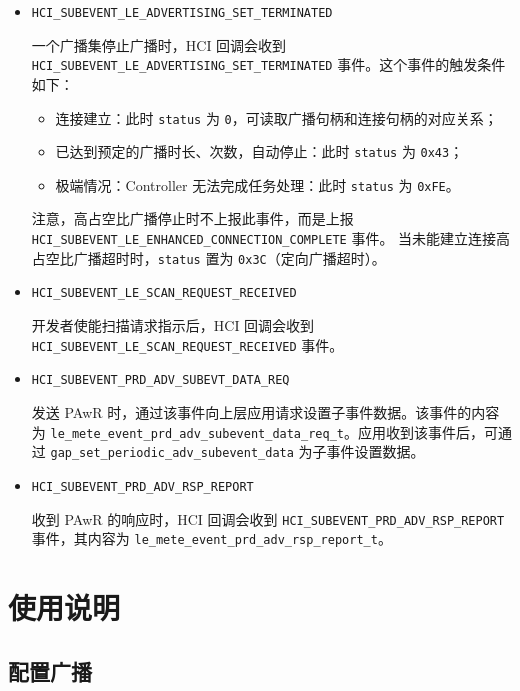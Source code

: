 \documentclass[
  12pt,
]{book}
\providecommand{\tightlist}{%
  \setlength{\itemsep}{0pt}\setlength{\parskip}{0pt}}
\begin{document}
\begin{itemize}
\item
  \texttt{HCI\_SUBEVENT\_LE\_ADVERTISING\_SET\_TERMINATED}

  一个广播集停止广播时，HCI 回调会收到 \texttt{HCI\_SUBEVENT\_LE\_ADVERTISING\_SET\_TERMINATED} 事件。这个事件的触发条件如下：

  \begin{itemize}
  \tightlist
  \item
    连接建立：此时 \texttt{status} 为 \texttt{0}，可读取广播句柄和连接句柄的对应关系；
  \item
    已达到预定的广播时长、次数，自动停止：此时 \texttt{status} 为 \texttt{0x43}；
  \item
    极端情况：Controller 无法完成任务处理：此时 \texttt{status} 为 \texttt{0xFE}。
  \end{itemize}

  注意，高占空比广播停止时不上报此事件，而是上报 \texttt{HCI\_SUBEVENT\_LE\_ENHANCED\_CONNECTION\_COMPLETE} 事件。
  当未能建立连接高占空比广播超时时，\texttt{status} 置为 \texttt{0x3C}（定向广播超时）。
\item
  \texttt{HCI\_SUBEVENT\_LE\_SCAN\_REQUEST\_RECEIVED}

  开发者使能扫描请求指示后，HCI 回调会收到 \texttt{HCI\_SUBEVENT\_LE\_SCAN\_REQUEST\_RECEIVED} 事件。
\item
  \texttt{HCI\_SUBEVENT\_PRD\_ADV\_SUBEVT\_DATA\_REQ}

  发送 PAwR 时，通过该事件向上层应用请求设置子事件数据。该事件的内容为
  \texttt{le\_mete\_event\_prd\_adv\_subevent\_data\_req\_t}。应用收到该事件后，可通过
  \texttt{gap\_set\_periodic\_adv\_subevent\_data} 为子事件设置数据。
\item
  \texttt{HCI\_SUBEVENT\_PRD\_ADV\_RSP\_REPORT}

  收到 PAwR 的响应时，HCI 回调会收到 \texttt{HCI\_SUBEVENT\_PRD\_ADV\_RSP\_REPORT} 事件，其内容为
  \texttt{le\_mete\_event\_prd\_adv\_rsp\_report\_t}。
\end{itemize}

\hypertarget{ux4f7fux7528ux8bf4ux660e}{%
\section{使用说明}\label{ux4f7fux7528ux8bf4ux660e}}

\hypertarget{ux914dux7f6eux5e7fux64ad}{%
\subsection{配置广播}\label{ux914dux7f6eux5e7fux64ad}}
\end{document}

